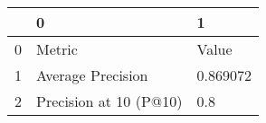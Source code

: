\begin{tabular}{lll}
\toprule
{} &                       0 &         1 \\
\midrule
0 &                  Metric &     Value \\
1 &       Average Precision &  0.869072 \\
2 &  Precision at 10 (P@10) &       0.8 \\
\bottomrule
\end{tabular}

